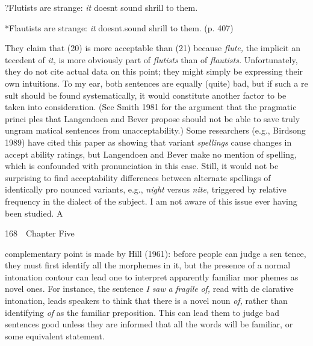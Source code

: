 \setcounter{listWWNumxxivleveli}{18}
\begin{listWWNumxxivleveli}
\item 
\begin{styleTextbody}
?Flutists are strange: \textit{it}\textit{ }doesn{\textquotesingle}t sound shrill to them.
\end{styleTextbody}


\item 
\begin{styleTextbody}
*Flautists are strange: \textit{it}\textit{ }doesn{\textquotesingle}t.sound shrill to them. (p. 407)
\end{styleTextbody}


\end{listWWNumxxivleveli}
\begin{styleTextbody}
They claim that (20) is more acceptable than (21) because \textit{flute,}\textit{ }the implicit an\- tecedent of \textit{it,}\textit{ }is more obviously part of \textit{flutists }than of \textit{flautists.}\textit{ }Unfortunately, they do not cite actual data on this point; they might simply be expressing their own intuitions. To my ear, both sentences are equally (quite) bad, but if such a re\- sult should be found systematically, it would constitute another factor to be taken into consideration. (See Smith 1981 for the argument that the pragmatic princi\- ples that Langendoen and Bever propose should not be able to save truly ungram\- matical sentences from unacceptability.) Some researchers (e.g., Birdsong 1989) have cited this paper as showing that variant \textit{spellings}\textit{ }cause changes in accept\- ability ratings, but Langendoen and Bever make no mention of spelling, which is confounded with pronunciation in this case. Still, it would not be surprising to find acceptability differences between alternate spellings of identically pro\- nounced variants, e.g., \textit{night}\textit{ }versus \textit{nite,}\textit{ }triggered by relative frequency in the dialect of the subject. I am not aware of this issue ever having been studied. A
\end{styleTextbody}


\clearpage\setcounter{page}{1}\begin{styleStandard}
168\ \ Chapter Five
\end{styleStandard}


\begin{styleStandard}
complementary point is made by Hill (1961): before people can judge a sen\- tence, they must first identify all the morphemes in it, but the presence of a normal intonation contour can lead one to interpret apparently familiar mor\- phemes as novel ones. For instance, the sentence \textit{I}\textit{ }\textit{saw}\textit{ }\textit{a}\textit{ }\textit{fragile}\textit{ }\textit{of,}\textit{ }read with de\- clarative intonation, leads speakers to think that there is a novel noun \textit{of,}\textit{ }rather than identifying \textit{of}\textit{ }as the familiar preposition. This can lead them to judge bad sentences good unless they are informed that {\textquotedbl}all the words will be familiar,{\textquotedbl} or some equivalent statement.
\end{styleStandard}



